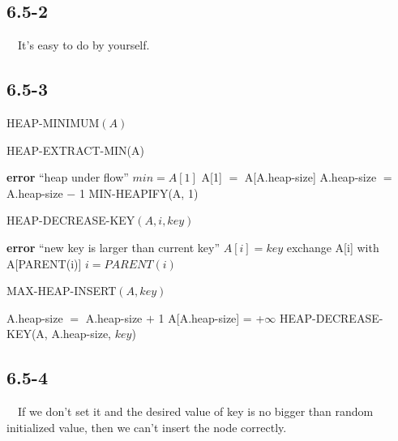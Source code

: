 \documentclass[10pt]{article}
\begin{document}
\subsection*{6.5-2}
~~It's easy to do by yourself.

\subsection*{6.5-3}
\begin{algorithm}
\caption{HEAP-MINIMUM$(A)$}
\begin{algorithmic}[1]
\end{algorithmic}
\end{algorithm}

\begin{algorithm}
\caption{HEAP-EXTRACT-MIN(A)}
\begin{algorithmic}[1]
\STATE \textbf{error} ``heap under flow''
\ENDIF
\STATE $min = A[1]$
\STATE A[1] $=$ A[A.heap-size]
\STATE A.heap-size $=$ A.heap-size $-$ 1
\STATE MIN-HEAPIFY(A, 1)
\end{algorithmic}
\end{algorithm}

\begin{algorithm}
\caption{HEAP-DECREASE-KEY$(A, i, key)$}
\begin{algorithmic}[1]
\STATE \textbf{error} ``new key is larger than current key''
\ENDIF
\STATE $A[i] = key$
\STATE exchange A[i] with A[PARENT(i)]
\STATE $i = PARENT(i)$
\ENDWHILE
\end{algorithmic}
\end{algorithm}

\begin{algorithm}
\caption{MAX-HEAP-INSERT$(A, key)$}
\begin{algorithmic}[1]
\STATE A.heap-size $=$ A.heap-size $+$ 1
\STATE A[A.heap-size] = +$\infty$
\STATE HEAP-DECREASE-KEY(A, A.heap-size, $key$)
\end{algorithmic}
\end{algorithm}

\subsection*{6.5-4}
~~If we don't set it and the desired value of key is no bigger than random initialized value, then we can't insert the node correctly.
\end{document}
